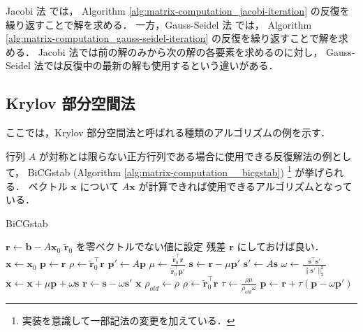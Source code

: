 Jacobi 法
では，
Algorithm \ref{alg:matrix-computation_jacobi-iteration}
の反復を繰り返すことで解を求める．
一方，Gauss-Seidel 法
では，
Algorithm \ref{alg:matrix-computation_gauss-seidel-iteration}
の反復を繰り返すことで解を求める．
Jacobi 法では前の解のみから次の解の各要素を求めるのに対し，
Gauss-Seidel 法では反復中の最新の解も使用するという違いがある．

\subsection{Krylov 部分空間法}

ここでは，Krylov 部分空間法と呼ばれる種類のアルゴリズムの例を示す．


行列 $A$ が対称とは限らない正方行列である場合に使用できる反復解法の例として，
BiCGstab (Algorithm \ref{alg:matrix-computation__bicgstab})
\footnote{実装を意識して一部記法の変更を加えている．}
が挙げられる．
ベクトル $\bm{x}$ について $A \bm{x}$ が計算できれば使用できるアルゴリズムとなっている．

\begin{algorithm}[tp]
    \caption{BiCGstab \cite{Golub2013}}
    \label{alg:matrix-computation__bicgstab}
    \begin{algorithmic}
        \State $\bm{r} \gets \bm{b} - A \bm{x}_0$
        \State $\tilde{\bm{r}}_0$ を零ベクトルでない値に設定
        \Comment 残差 $\bm{r}$ にしておけば良い．
        \State $\bm{x} \gets \bm{x}_0$
        \State $\bm{p} \gets \bm{r}$
        \State $\rho \gets \tilde{\bm{r}}_0^\top \bm{r}$
        \Loop
        \State $\bm{p}' \gets A \bm{p}$
        \State $\mu \gets \frac{\tilde{\bm{r}}_0^\top \bm{r}}{\tilde{\bm{r}}_0^\top \bm{p}'}$
        \State $\bm{s} \gets \bm{r} - \mu \bm{p}'$
        \State $\bm{s}' \gets A \bm{s}$
        \State $\omega \gets \frac{\bm{s}^\top \bm{s}'}{\|\bm{s}'\|_2^2}$
        \State $\bm{x} \gets \bm{x} + \mu \bm{p} + \omega \bm{s}$
        \State $\bm{r} \gets \bm{s} - \omega \bm{s}'$
        \State \Return $\bm{x}$
        \EndIf
        \State $\rho_{old} \gets \rho$
        \State $\rho \gets \tilde{\bm{r}}_0^\top \bm{r}$
        \State $\tau \gets \frac{\rho \mu}{\rho_{old} \omega}$
        \State $\bm{p} \gets \bm{r} + \tau(\bm{p} - \omega \bm{p}')$
        \EndLoop
        \EndProcedure
    \end{algorithmic}
\end{algorithm}

